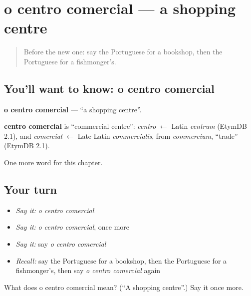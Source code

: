 \section[o centro comercial]{o centro comercial — a shopping centre}

\label{lesson:PT-C227-centro-comercial}



\begin{quote}
Before the new one: say the Portuguese for a bookshop, then the Portuguese for a fishmonger's.
\end{quote}

\subsection*{You'll want to know: o centro comercial}
\textbf{o centro comercial} — \textquotedblleft{}a shopping centre\textquotedblright{}.

\begin{cousinweb}
\textbf{centro comercial} is \textquotedblleft{}commercial centre\textquotedblright{}: \emph{centro} $\leftarrow$ Latin \emph{centrum} (EtymDB 2.1), and \emph{comercial} $\leftarrow$ Late Latin \emph{commercialis}, from \emph{commercium}, \textquotedblleft{}trade\textquotedblright{} (EtymDB 2.1).
\end{cousinweb}

\begin{grammarlens}[title={What you've built}]
One more word for this chapter.
\end{grammarlens}

\subsection*{Your turn}
\begin{itemize}
\raggedright
  \item \emph{Say it:} \emph{o centro comercial}
  \item \emph{Say it:} \emph{o centro comercial}, once more
  \item \emph{Say it:} say \emph{o centro comercial}
  \item \emph{Recall:} say the Portuguese for a bookshop, then the Portuguese for a fishmonger's, then say \emph{o centro comercial} again
\end{itemize}

\begin{tcolorbox}[breakable,colback=teal!4,colframe=teal!35!black,title={Before you move on}]
What does o centro comercial mean? (\textquotedblleft{}A shopping centre\textquotedblright{}.) Say it once more.
\end{tcolorbox}
